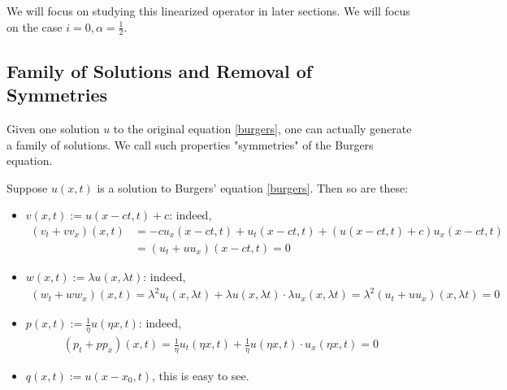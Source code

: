\documentclass[11pt,a4paper]{article}
\begin{document}
We will focus on studying this linearized operator in later sections. We will focus on the case $i = 0, \alpha = \frac{1}{2}$.

\subsection{Family of Solutions and Removal of Symmetries}
Given one solution $u$ to the original equation \eqref{burgers}, one can actually generate a family of solutions. We call such properties "symmetries" of the Burgers equation. 

Suppose $u(x, t)$ is a solution to Burgers' equation \eqref{burgers}. Then so are these:
\begin{itemize}
    \item $v(x,t) := u(x-ct, t)+c$: indeed,
    \begin{align*}
        (v_t + vv_x)(x,t) &= -cu_x(x-ct,t) + u_t(x-ct,t) + (u(x-ct,t)+c)u_x(x-ct,t) \\
        &= (u_t+uu_x)(x-ct,t) = 0
    \end{align*}
    \item $w(x,t) := \lambda u(x,\lambda t)$: indeed,
    \begin{align*}
        (w_t+ww_x)(x,t) = \lambda^2 u_t(x,\lambda t) + \lambda u(x,\lambda t)\cdot \lambda u_x(x,\lambda t) = \lambda^2 (u_t+uu_x)(x,\lambda t) = 0
    \end{align*}
    \item $p(x,t) := \frac{1}{\eta} u(\eta x,t)$: indeed,
    \begin{align*}
        (p_t  + pp_x)(x,t) = \frac{1}{\eta} u_t(\eta x,t) + \frac{1}{\eta} u(\eta x, t)\cdot u_x(\eta x, t) = 0
    \end{align*}
    \item $q(x,t) := u(x-x_0,t)$, this is easy to see.
\end{itemize}
\end{document}
